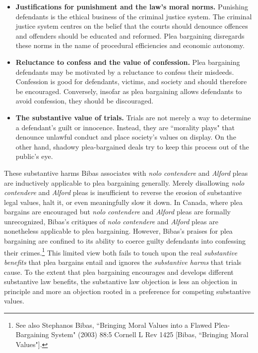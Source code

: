 \begin{itemize}
    \item \textbf{Justifications for punishment and the law's moral norms.} Punishing defendants is the ethical business of the criminal justice system. The criminal justice system centres on the belief that the courts should denounce offences and offenders should be educated and reformed. Plea bargaining disregards these norms in the name of procedural efficiencies and economic autonomy.
    \item \textbf{Reluctance to confess and the value of confession.} Plea bargaining defendants may be motivated by a reluctance to confess their misdeeds. Confession is good for defendants, victims, and society and should therefore be encouraged. Conversely, insofar as plea bargaining allows defendants to avoid confession, they should be discouraged.
    \item \textbf{The substantive value of trials.} Trials are not merely a way to determine a defendant's guilt or innocence. Instead, they are ``morality plays" that denounce unlawful conduct and place society's values on display. On the other hand, shadowy plea-bargained deals try to keep this process out of the public's eye.
\end{itemize}
These substantive harms Bibas associates with \textit{nolo contendere} and \textit{Alford} pleas are inductively applicable to plea bargaining generally. Merely disallowing \textit{nolo contendere} and \textit{Alford} pleas is insufficient to reverse the erosion of substantive legal values, halt it, or even meaningfully slow it down. In Canada, where plea bargains are encouraged but \textit{nolo contendere} and \textit{Alford} pleas are formally unrecognized, Bibas's critiques of \textit{nolo contendere} and \textit{Alford} pleas are nonetheless applicable to plea bargaining. However, Bibas's praises for plea bargaining are confined to its ability to coerce guilty defendants into confessing their crimes.\footnote{See also Stephanos Bibas, ``Bringing Moral Values into a Flawed Plea-Bargaining System" (2003) 88:5 Cornell L Rev 1425 [Bibas, ``Bringing Moral Values"].} This limited view both fails to touch upon the real \textit{substantive benefits} that plea bargains entail and ignores the \textit{substantive harms} that trials cause. To the extent that plea bargaining encourages and develops different substantive law benefits, the substantive law objection is less an objection in principle and more an objection rooted in a preference for competing substantive values.

